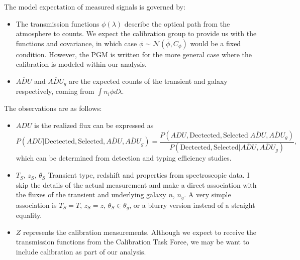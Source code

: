 \documentclass[preprint]{aastex}
\begin{document}
The model expectation of measured  signals is governed by:
\begin{itemize}
\item The transmission functions $\phi(\lambda)$ describe the optical path from the
atmosphere to counts.  We expect
the calibration group to provide us with the functions and covariance,
in which case
$\phi \sim \mathcal{N}(\bar{\phi},C_\phi)$ would be a fixed condition.
However, the PGM is written for the more general case where the calibration
is modeled within our analysis.
\item $\overline{\mathit{ADU}}$ and
$\overline{\mathit{ADU}}_g$ are the expected counts of the transient and galaxy respectively,
coming from $\int n_i \phi d\lambda$.
\end{itemize}

The observations are as follows:
\begin{itemize}
\item ${\mathit{ADU}}$ is the realized flux can be expressed as
\begin{equation}
P({\mathit{ADU}} | \text{Dectected}, \text{Selected}, \overline{\mathit{ADU}}, 
\overline{\mathit{ADU}}_g)=\frac{P({\mathit{ADU}},\text{Dectected}, \text{Selected} |  
\overline{\mathit{ADU}},  \overline{\mathit{ADU}}_g)}{P(\text{Dectected}, \text{Selected} | 
\overline{\mathit{ADU}},  \overline{{\mathit{ADU}}}_g)},
\end{equation}
which can be determined from detection and typing efficiency studies.
\item ${T}_S$, ${z}_S$, ${\theta}_S$ Transient type, redshift and properties from
spectroscopic data. I skip the details of the actual measurement  and make a direct association
with the fluxes of the transient and underlying galaxy $n$, $n_g$.
A very simple association is ${T}_S = T$, ${z}_S=z$, ${\theta}_S \in \theta_g$,
or a blurry version instead of a straight equality.
\item ${Z}$ represents the calibration measurements.  Although we expect to receive
the transmission functions from the Calibration Task Force, we may be want to include
calibration as part of our analysis.
\end{itemize}
\end{document}
